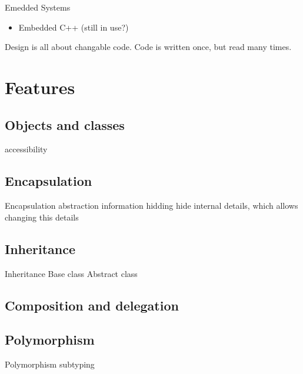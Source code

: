 \documentclass{beamer}
\begin{document}
\begin{frame}{Emedded Systems}
\begin{itemize}
  \item Embedded C++ (still in use?)
\end{itemize}
\end{frame}




\begin{frame}
Design is all about changable code.
Code is written once, but read many times.
\end{frame}

\section{Features}

\begin{frame}
\subsection{Objects and classes}
accessibility
\end{frame}

\subsection{Encapsulation}
\begin{frame}{Encapsulation}
abstraction
information hidding
hide internal details, which allows changing this details
\end{frame}

\subsection{Inheritance}
\begin{frame}{Inheritance}
Base class
Abstract class
\end{frame}

\subsection{Composition and delegation}
\subsection{Polymorphism}
\begin{frame}{Polymorphism}
subtyping
\end{frame}
\end{document}
